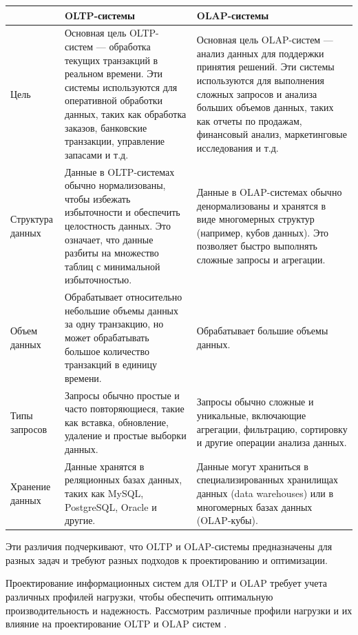 \begin{table}[!ht]
	\centering
	\begin{tabular}{|m{4cm}|m{6cm}|m{6cm}|}
		\hline
		 ~ &\textbf{OLTP-системы} & \textbf{OLAP-системы} \\ 
		\hline
		Цель & Основная цель OLTP-систем — обработка текущих транзакций в реальном времени. Эти системы используются для оперативной обработки данных, таких как обработка заказов, банковские транзакции, управление запасами и т.д. & Основная цель OLAP-систем — анализ данных для поддержки принятия решений. Эти системы используются для выполнения сложных запросов и анализа больших объемов данных, таких как отчеты по продажам, финансовый анализ, маркетинговые исследования и т.д. \\ 
		\hline
		Структура данных & Данные в OLTP-системах обычно нормализованы, чтобы избежать избыточности и обеспечить целостность данных. Это означает, что данные разбиты на множество таблиц с минимальной избыточностью. & Данные в OLAP-системах обычно денормализованы и хранятся в виде многомерных структур (например, кубов данных). Это позволяет быстро выполнять сложные запросы и агрегации. \\ 
		\hline
		Объем данных & Обрабатывает относительно небольшие объемы данных за одну транзакцию, но может обрабатывать большое количество транзакций в единицу времени. & Обрабатывает большие объемы данных.\\ 
		\hline
		Типы запросов &  Запросы обычно простые и часто повторяющиеся, такие как вставка, обновление, удаление и простые выборки данных. &Запросы обычно сложные и уникальные, включающие агрегации, фильтрацию, сортировку и другие операции анализа данных. \\ 
		\hline
		Хранение данных &  Данные хранятся в реляционных базах данных, таких как MySQL, PostgreSQL, Oracle и другие. & Данные могут храниться в специализированных хранилищах данных (data warehouses) или в многомерных базах данных (OLAP-кубы).\\ 
		\hline
	\end{tabular}
\end{table}

Эти различия подчеркивают, что OLTP и OLAP-системы предназначены для разных задач и требуют разных подходов к проектированию и оптимизации.

Проектирование информационных систем для OLTP и OLAP требует учета различных профилей нагрузки, чтобы обеспечить оптимальную производительность и надежность. Рассмотрим различные профили нагрузки и их влияние на проектирование OLTP и OLAP систем \autocite{OLAP_OLTP}.


